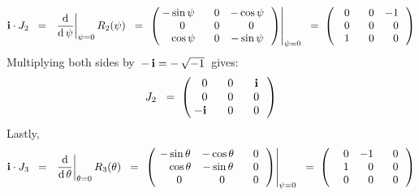 \begin{equation*}
\i \cdot J_{2}
\;\; = \;\;
	\left.\dfrac{\d}{\d\,\psi}\right\vert_{\psi = 0} R_{2}(\psi)
\;\; = \;
	\left.\left(\!\!
		\begin{array}{ccc}
			{\color{black}-}\sin\psi & {\color{white}-}0 & {\color{black}-}\cos\psi \\
			{\color{white}-}0 & {\color{white}-}0 & {\color{white}-}0 \\
			{\color{white}-}\cos\psi & {\color{white}-}0 & {\color{black}-}\sin\psi \\
			\end{array}
		\,\right)\right\vert_{\psi = 0}
\;\; = \;
	\left(\!\!
		\begin{array}{ccc}
			{\color{white}-}0 & {\color{white}-}0 & {\color{black}-}1 \\
			{\color{white}-}0 & {\color{white}-}0 & {\color{white}-}0 \\
			{\color{white}-}1 & {\color{white}-}0 & {\color{white}-}0 \\
			\end{array}
		\,\right)
\end{equation*}
Multiplying both sides by \,$-\,\textnormal{\bf i} = -\,\sqrt{-1}$\, gives:
\begin{equation*}
J_{2}
\;\; = \;
	\left(\!\!
		\begin{array}{ccc}
			{\color{white}-}0 & {\color{white}-}0 & {\color{white}-}\i \\
			{\color{white}-}0 & {\color{white}-}0 & {\color{white}-}0 \\
			{\color{black}-}\i & {\color{white}-}0 & {\color{white}-}0 \\
			\end{array}
		\,\right)
\end{equation*}
Lastly,
\begin{equation*}
\i \cdot J_{3}
\;\; = \;\;
	\left.\dfrac{\d}{\d\,\theta}\right\vert_{\theta = 0} R_{3}(\theta)
\;\; = \;
	\left.\left(\!
		\begin{array}{ccc}
			{\color{black}-}\sin\theta & {\color{black}-}\cos\theta & {\color{white}-}0 \\
			{\color{white}-}\cos\theta & {\color{black}-}\sin\theta & {\color{white}-}0 \\
			{\color{white}-}0 & {\color{white}-}0 & {\color{white}-}0 \\
			\end{array}
		\,\right)\right\vert_{\psi = 0}
\;\; = \;
	\left(
		\begin{array}{ccc}
			{\color{white}-}0 & {\color{black}-}1 & {\color{white}-}0 \\
			{\color{white}-}1 & {\color{white}-}0 & {\color{white}-}0 \\
			{\color{white}-}0 & {\color{white}-}0 & {\color{white}-}0 \\
			\end{array}
		\,\right)
\end{equation*}
